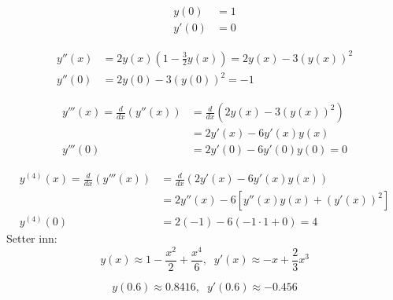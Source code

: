 \begin{align}
  y(0) & = 1 \\
  y'(0) & = 0
\end{align}

\begin{align}
  y''(x) & = 2y(x)\left( 1- \frac{3}{2}y(x) \right)
           = 2y(x)-3 \left( y(x) \right)^2 \\
  y''(0) & = 2y(0) - 3\left( y(0) \right)^2 = -1
\end{align}

\begin{align}
  y'''(x) = \frac{d}{dx}\left( y''(x) \right) \nonumber
         &= \frac{d}{dx} \left( 2y(x)-3 \left( y(x) \right)^2 \right) \\
         &= 2y'(x) - 6 y'(x)y(x) \\
  y'''(0)&= 2y'(0) - 6 y'(0)y(0) = 0
\end{align}

\begin{align}
  y^{(4)}(x)   = \frac{d}{dx} \left( y'''(x) \right)
              &= \frac{d}{dx} ( 2y'(x) - 6 y'(x)y(x) ) \nonumber\\
              &=2y''(x) - 6 \left[ y''(x)y(x) + (y'(x))^2 \right] \\
  y^{(4)}(0)  &= 2(-1) - 6 ( -1\cdot 1 + 0) = 4
\end{align}
Setter inn:
\begin{equation}
  y(x)  \approx 1  - \frac{x^2}{2} + \frac{x^4}{6}, \;\;
  y'(x) \approx - x + \frac{2}{3} x^3
\end{equation}

\begin{equation}
  y(0.6) \approx 0.8416, \;\; y'(0.6) \approx -0.456
\end{equation}

\clearpage






